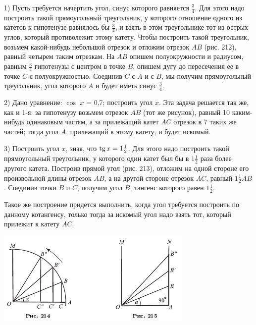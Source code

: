 \documentclass[oneside]{book}
\begin{document}
1) Пусть требуется начертить угол, синус которого равняется $\tfrac34$. Для этого надо построить такой прямоугольный треугольник, у которого отношение одного из катетов к гипотенузе равнялось бы $\tfrac34$, и взять в этом треугольнике тот из острых углов, который противолежит этому катету.
Чтобы построить такой треугольник, возьмем какой-нибудь небольшой отрезок и отложим отрезок $AB$ (рис. 212), равный четырем таким отрезкам.
На $AB$ %
опишем полуокружности и радиусом, равным $\tfrac34$ гипотенузы с центром в точке $B$, опишем дугу до пересечения ее в точке $C$ с полуокружностью.
Соединив $C$ с $A$ и с $B$, мы получим прямоугольный треугольник, угол которого $A$ и будет иметь синус $\tfrac34$.

2) Дано уравнение:
$\cos$ $x$ = 0,7;
построить угол $x$.
Эта задача решается так же, как и 1-я:
за гипотенузу возьмем отрезок $AB$ (тот же рисунок), равный 10 каким-нибудь одинаковым частям, а за прилежащий катет $AC$ отрезок в 7 таких же частей;
тогда угол $A$, прилежащий к этому катету, и будет искомый.

3) Построить угол $x$, зная, что $\mathrm{tg}\, x=1\tfrac12$.
Для этого надо построить такой прямоугольный треугольник, у которого один катет был бы в $1\tfrac12$ раза более другого катета.
Построив прямой угол (рис. 213), отложим на одной стороне его произвольной длины отрезок $AB$, а на другой стороне отрезок $AC$, равный $1\tfrac12AB$.
Соединив точки $B$ и $C$, получим угол $B$, тангенс которого равен $1\tfrac12$.

Такое же построение придется выполнить, когда угол требуется построить по данному котангенсу, только тогда за искомый угол надо взять тот, который прилежит к катету $AC$.

\includegraphics{pics/ris-214-215}
\end{document}
